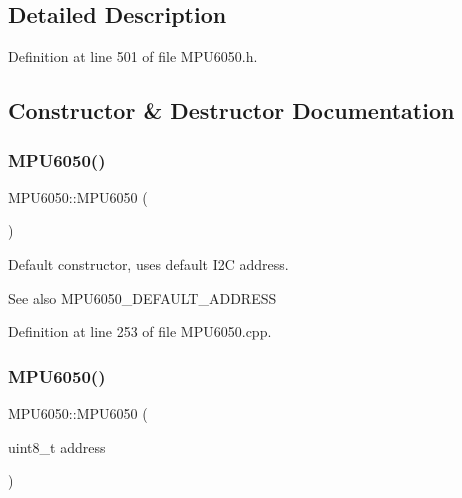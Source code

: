\subsection{Detailed Description}


Definition at line 501 of file M\+P\+U6050.\+h.



\subsection{Constructor \& Destructor Documentation}
\mbox{\label{classMPU6050_a7c0146d45537e4bd7a0d4c1c476fdab7}} 
\subsubsection{\texorpdfstring{MPU6050()}{MPU6050()}\hspace{0.1cm}{\footnotesize\ttfamily [1/2]}}
{\footnotesize\ttfamily M\+P\+U6050\+::\+M\+P\+U6050 (\begin{DoxyParamCaption}{ }\end{DoxyParamCaption})}



Default constructor, uses default I2C address. 

\begin{DoxySeeAlso}{See also}
M\+P\+U6050\+\_\+\+D\+E\+F\+A\+U\+L\+T\+\_\+\+A\+D\+D\+R\+E\+SS 
\end{DoxySeeAlso}


Definition at line 253 of file M\+P\+U6050.\+cpp.

\mbox{\label{classMPU6050_a94df4ec1565317ba5279122b3bf7e056}} 
\subsubsection{\texorpdfstring{MPU6050()}{MPU6050()}\hspace{0.1cm}{\footnotesize\ttfamily [2/2]}}
{\footnotesize\ttfamily M\+P\+U6050\+::\+M\+P\+U6050 (\begin{DoxyParamCaption}\item[{uint8\+\_\+t}]{address }\end{DoxyParamCaption})}



